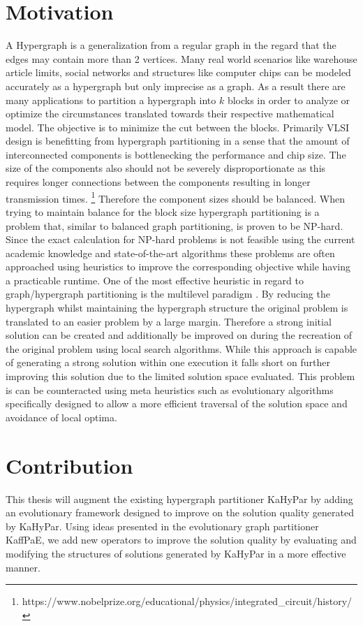 \documentclass[a4paper,12pt,titlepage, BCOR7mm,headsepline]{scrbook}
\numberwithin{equation}{section}
\begin{document}
\section{Motivation}
A Hypergraph is a generalization from a regular graph in the regard that the edges may contain more than 2 vertices.
Many real world scenarios like warehouse article limits, social networks and structures like computer chips can be modeled accurately as a hypergraph but only imprecise as a graph. As a result there are many applications to partition a hypergraph into $k$ blocks in order to analyze or optimize the circumstances translated towards their respective mathematical model. The objective is to minimize the cut between the blocks. Primarily VLSI design is benefitting from hypergraph partitioning in a sense that the amount of interconnected components is bottlenecking the performance and chip size\cite{boese1992high}.  The size of the components also should not be severely disproportionate as this requires longer connections between the components resulting in longer transmission times. \footnote{https://www.nobelprize.org/educational/physics/integrated\_circuit/history/} Therefore the component sizes should be balanced.
When trying to maintain balance for the block size hypergraph partitioning is a problem that, similar to balanced graph partitioning, is proven to be NP-hard\cite{garey2002computers}. Since the exact calculation for NP-hard problems is not feasible using the current academic knowledge and state-of-the-art algorithms these problems are often approached using heuristics to improve the corresponding objective while having a practicable runtime. One of the most effective heuristic in regard to graph/hypergraph partitioning is the multilevel paradigm \cite{bulucc2016recent}. By reducing the hypergraph whilst maintaining the hypergraph structure the original problem is translated to an easier problem by a large margin. Therefore a strong initial solution can be created and additionally be improved on during the recreation of the original problem using local search algorithms. While this approach is capable of generating a strong solution within one execution it falls short on further improving this solution due to the limited solution space evaluated. This problem is can be counteracted using meta heuristics such as evolutionary algorithms specifically designed to allow a more efficient traversal of the solution space and avoidance of local optima. 

\section{Contribution}
This thesis will augment the existing hypergraph partitioner KaHyPar by adding an evolutionary framework designed to improve on the solution quality generated by KaHyPar. Using ideas presented in the evolutionary graph partitioner KaffPaE, we add new operators to improve the solution quality by evaluating and modifying the structures of solutions generated by KaHyPar in a more effective manner. 
\end{document}

